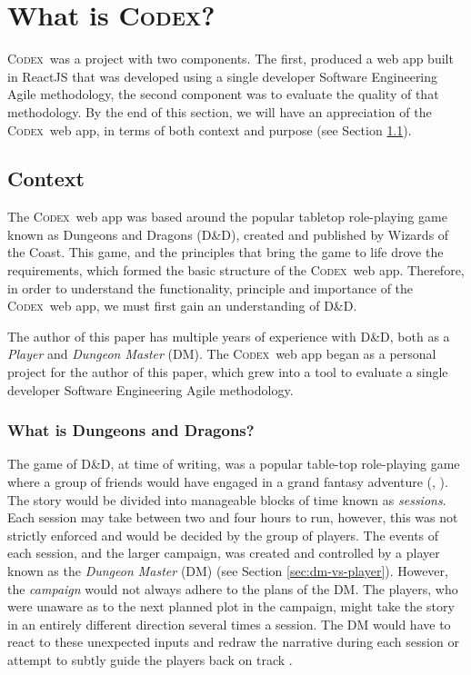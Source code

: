 \documentclass[final]{cmpreport}
\newcommand{\WotC}{Wizards of the Coast}
\newcommand{\dnd}{D\&D}
\newcommand{\Codex}{\textsc{Codex}}
\begin{document}
	\section{What is \Codex?} \label{sec:what-codex}
	\Codex \ was a project with two components. The first, produced a web app built in ReactJS that was developed using a single developer Software Engineering Agile methodology, the second component was to evaluate the quality of that methodology. By the end of this section, we will have an appreciation of the \Codex \ web app, in terms of both context and purpose (see Section \ref{sec:context}).
	
		\subsection{Context} \label{sec:context}
		The \Codex \ web app was based around the popular tabletop role-playing game known as Dungeons and Dragons (\dnd), created and published by \WotC. This game, and the principles that bring the game to life drove the requirements, which formed the basic structure of the \Codex \ web app. Therefore, in order to understand the functionality, principle and importance of the \Codex \ web app, we must first gain an understanding of \dnd. 
		
		The author of this paper has multiple years of experience with \dnd, both as a \emph{Player} and \emph{Dungeon Master} (DM). The \Codex \ web app began as a personal project for the author of this paper, which grew into a tool to evaluate a single developer Software Engineering Agile methodology. 
		
			\subsubsection{What is Dungeons and Dragons?} \label{sec:what-dnd}
			The game of \dnd, at time of writing, was a popular table-top role-playing game where a group of friends would have engaged in a grand fantasy adventure (\cite{DnDOriginal}, \cite{DnDHistory}). The story would be divided into manageable blocks of time known as \emph{sessions}. Each session may take between two and four hours to run, however, this was not strictly enforced and would be decided by the group of players. The events of each session, and the larger campaign, was created and controlled by a player known as the \emph{Dungeon Master} (DM) (see Section \ref{sec:dm-vs-player}). However, the \textit{campaign} would not always adhere to the plans of the DM. The players, who were unaware as to the next planned plot in the campaign, might take the story in an entirely different direction several times a session. The DM would have to react to these unexpected inputs and redraw the narrative during each session or attempt to subtly guide the players back on track \citep{PlayerHandbook}. 
			
\end{document}
